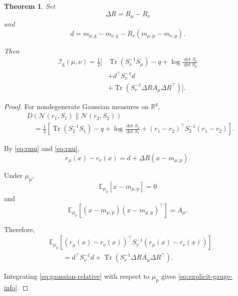 \documentclass[10pt,a4paper]{amsart}
\newtheorem{theorem}{Theorem}
\newcommand{\R}{\mathbb{R}}
\newcommand{\Tr}{\operatorname{Tr}}
\begin{document}
\begin{theorem}
\label{thm:explicit}
Set
\begin{equation}
\Delta R
=
R_\mu-R_\nu
\label{eq:delta-R}
\end{equation}
and
\begin{equation}
d
=
m_{\mu,\mathrm g}
-
m_{\nu,\mathrm g}
-
R_\nu
\left(
m_{\mu,\mathrm p}
-
m_{\nu,\mathrm p}
\right).
\label{eq:d}
\end{equation}

Then
\begin{align}
\mathcal I_{\mathrm g}(\mu,\nu)
=
\frac12
\Bigg[
&
\Tr(S_\nu^{-1}S_\mu)
-
q
+
\log
\frac{
\det S_\nu
}{
\det S_\mu
}
\nonumber\\
&+
d^\top S_\nu^{-1}d
\nonumber\\
&+
\Tr\left(
S_\nu^{-1}
\Delta R
A_\mu
\Delta R^\top
\right)
\Bigg].
\label{eq:explicit-gauge-info}
\end{align}
\end{theorem}

\begin{proof}
For nondegenerate Gaussian measures on \(\R^q\),
\begin{align}
&D\left(
\mathcal N(r_1,S_1)
\middle\|
\mathcal N(r_2,S_2)
\right)
\nonumber\\
&\quad=
\frac12
\left[
\Tr(S_2^{-1}S_1)
-
q
+
\log
\frac{
\det S_2
}{
\det S_1
}
+
(r_1-r_2)^\top
S_2^{-1}
(r_1-r_2)
\right].
\label{eq:gaussian-relative}
\end{align}

By \eqref{eq:rmu} and \eqref{eq:rnu},
\begin{equation}
r_\mu(x)-r_\nu(x)
=
d+\Delta R(x-m_{\mu,\mathrm p}).
\label{eq:r-difference}
\end{equation}

Under \(\mu_{\mathrm p}\),
\begin{equation}
\mathbb E_{\mu_{\mathrm p}}
\left[
x-m_{\mu,\mathrm p}
\right]
=
0
\label{eq:centered}
\end{equation}
and
\begin{equation}
\mathbb E_{\mu_{\mathrm p}}
\left[
(x-m_{\mu,\mathrm p})
(x-m_{\mu,\mathrm p})^\top
\right]
=
A_\mu.
\label{eq:covariance}
\end{equation}

Therefore,
\begin{align}
&
\mathbb E_{\mu_{\mathrm p}}
\left[
(r_\mu(x)-r_\nu(x))^\top
S_\nu^{-1}
(r_\mu(x)-r_\nu(x))
\right]
\nonumber\\
&\qquad=
d^\top S_\nu^{-1}d
+
\Tr\left(
S_\nu^{-1}
\Delta R
A_\mu
\Delta R^\top
\right).
\label{eq:expectation-quadratic}
\end{align}

Integrating \eqref{eq:gaussian-relative} with respect to
\(\mu_{\mathrm p}\) gives
\eqref{eq:explicit-gauge-info}.
\end{proof}
\end{document}
